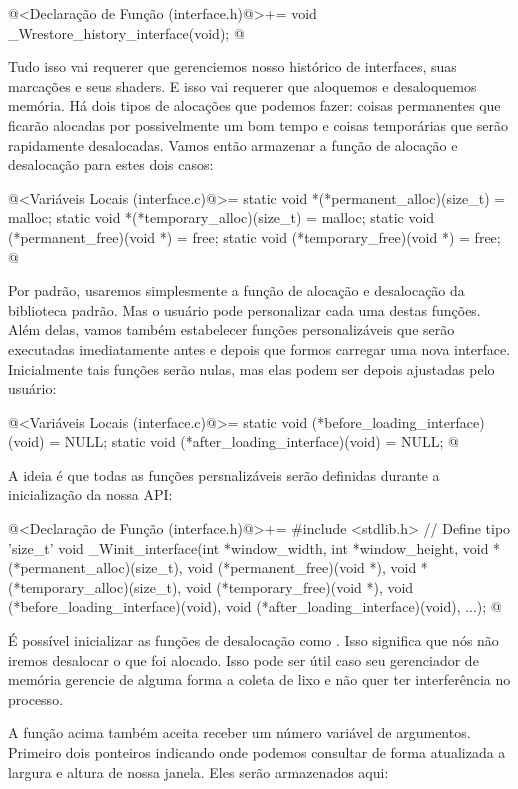 \iniciocodigo
@<Declaração de Função (interface.h)@>+=
void _Wrestore_history_interface(void);
@
\fimcodigo

Tudo isso vai requerer que gerenciemos nosso histórico de interfaces,
suas marcações e seus shaders. E isso vai requerer que aloquemos e
desaloquemos memória. Há dois tipos de alocações que podemos fazer:
coisas permanentes que ficarão alocadas por possivelmente um bom tempo
e coisas temporárias que serão rapidamente desalocadas. Vamos então
armazenar a função de alocação e desalocação para estes dois casos:

\iniciocodigo
@<Variáveis Locais (interface.c)@>=
static void *(*permanent_alloc)(size_t) = malloc;
static void *(*temporary_alloc)(size_t) = malloc;
static void (*permanent_free)(void *) = free;
static void (*temporary_free)(void *) = free;
@
\fimcodigo

Por padrão, usaremos simplesmente a função de alocação e desalocação
da biblioteca padrão. Mas o usuário pode personalizar cada uma destas
funções. Além delas, vamos também estabelecer funções personalizáveis
que serão executadas imediatamente antes e depois que formos carregar
uma nova interface. Inicialmente tais funções serão nulas, mas elas
podem ser depois ajustadas pelo usuário:

\iniciocodigo
@<Variáveis Locais (interface.c)@>=
static void (*before_loading_interface)(void) = NULL;
static void (*after_loading_interface)(void) = NULL;
@
\fimcodigo

A ideia é que todas as funções persnalizáveis serão definidas durante
a inicialização da nossa API:

\iniciocodigo
@<Declaração de Função (interface.h)@>+=
#include <stdlib.h> // Define tipo 'size_t'
void _Winit_interface(int *window_width, int *window_height,
                      void *(*permanent_alloc)(size_t),
                      void (*permanent_free)(void *),
                      void *(*temporary_alloc)(size_t),
                      void (*temporary_free)(void *),
                      void (*before_loading_interface)(void),
                      void (*after_loading_interface)(void),
                      ...);
@
\fimcodigo


É possível inicializar as funções de desalocação como
. Isso significa que nós não iremos desalocar o que
foi alocado. Isso pode ser útil caso seu gerenciador de memória
gerencie de alguma forma a coleta de lixo e não quer ter interferência
no processo.

A função acima também aceita receber um número variável de
argumentos. Primeiro dois ponteiros indicando onde podemos consultar
de forma atualizada a largura e altura de nossa janela. Eles serão
armazenados aqui:

